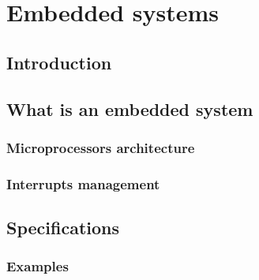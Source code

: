 \documentclass[../main.tex]{subfiles}
\begin{document}

\clearpage
\thispagestyle{empty}
\vspace*{7cm}
\section{Embedded systems}
\vspace*{1.5cm}


\subsection{Introduction}

\subsection{What is an embedded system}

\subsubsection{Microprocessors architecture}

\subsubsection{Interrupts management}


\subsection{Specifications}

\subsubsection{Examples}
\end{document}
